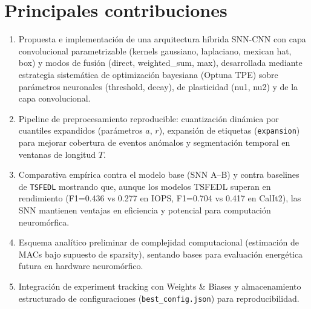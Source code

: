 \section{Principales contribuciones}
\begin{enumerate}
    \item Propuesta e implementación de una arquitectura híbrida SNN-CNN con capa convolucional parametrizable (kernels gaussiano, laplaciano, mexican hat, box) y modos de fusión (direct, weighted\_sum, max), desarrollada mediante estrategia sistemática de optimización bayesiana (Optuna TPE) sobre parámetros neuronales (threshold, decay), de plasticidad (nu1, nu2) y de la capa convolucional.
    \item Pipeline de preprocesamiento reproducible: cuantización dinámica por cuantiles expandidos (parámetros \(a\), \(r\)), expansión de etiquetas (\texttt{expansion}) para mejorar cobertura de eventos anómalos y segmentación temporal en ventanas de longitud \(T\).
    \item Comparativa empírica contra el modelo base (SNN A--B) y contra baselines de \texttt{TSFEDL} mostrando que, aunque los modelos TSFEDL superan en rendimiento (F1=0.436 vs 0.277 en IOPS, F1=0.704 vs 0.417 en CalIt2), las SNN mantienen ventajas en eficiencia y potencial para computación neuromórfica.
    \item Esquema analítico preliminar de complejidad computacional (estimación de MACs bajo supuesto de sparsity), sentando bases para evaluación energética futura en hardware neuromórfico.
    \item Integración de experiment tracking con Weights \& Biases y almacenamiento estructurado de configuraciones (\texttt{best\_config.json}) para reproducibilidad.
\end{enumerate}

